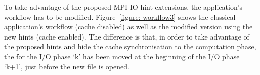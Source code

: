To take advantage of the proposed MPI-IO hint extensions, the application's workflow has to be modified. Figure~\ref{figure: workflow3} shows the classical application's workflow (cache disabled) as well as the modified version using the new hints (cache enabled). The difference %
is that, in order to take advantage of the proposed hints and hide the cache synchronisation to the computation phase, the  for the I/O phase `k' %
has been moved at the beginning of the I/O phase `k+1', just before the new file is opened.
